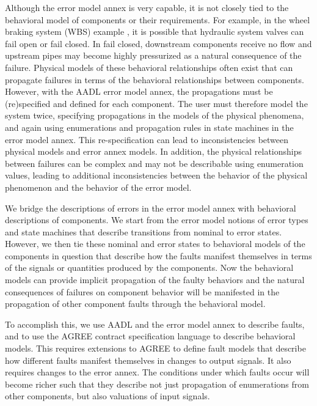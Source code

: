 Although the error model annex is very capable, it is not closely tied to the behavioral model of components or their requirements. For example, in the wheel braking system (WBS) example \cite{AIR6110}, it is possible that hydraulic system valves can fail open or fail closed. In fail closed, downstream components receive no flow and upstream pipes may become highly pressurized as a natural consequence of the failure. Physical models of these behavioral relationships often exist that can propagate failures in terms of the behavioral relationships between components. However, with the AADL error model annex, the propagations must be (re)specified and defined for each component. The user must therefore model the system twice, specifying propagations in the models of the physical phenomena, and again using enumerations and propagation rules in state machines in the error model annex. This re-specification can lead to inconsistencies between physical models and error annex models. In addition, the physical relationships between failures can be complex and may not be describable using enumeration values, leading to additional inconsistencies between the behavior of the physical phenomenon and the behavior of the error model.

We bridge the descriptions of errors in the error model annex with behavioral descriptions of components. We start from the error model notions of error types and state machines that describe transitions from nominal to error states. However, we then tie these nominal and error states to behavioral models of the components in question that describe how the faults manifest themselves in terms of the signals or quantities produced by the components. Now the behavioral models can provide implicit propagation of the faulty behaviors and the natural consequences of failures on component behavior will be manifested in the propagation of other component faults through the behavioral model.

To accomplish this, we use AADL and the error model annex to describe faults, and to use the AGREE contract specification language to describe behavioral models. This requires extensions to AGREE to define fault models that describe how different faults manifest themselves in changes to output signals. It also requires changes to the error annex. The conditions under which faults occur will become richer such that they describe not just propagation of enumerations from other components, but also valuations of input signals. 
